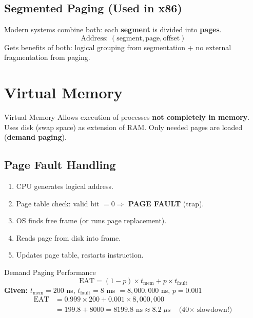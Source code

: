 \documentclass[12pt,a4paper]{article}
\begin{document}
\subsection{Segmented Paging (Used in x86)}
Modern systems combine both: each \textbf{segment} is divided into \textbf{pages}.
\[
\text{Address: } (\text{segment}, \text{page}, \text{offset})
\]
Gets benefits of both: logical grouping from segmentation + no external fragmentation from paging.

\section{Virtual Memory}

\begin{conceptbox}{Virtual Memory}
Allows execution of processes \textbf{not completely in memory}. Uses disk (swap space) as extension of RAM. Only needed pages are loaded (\textbf{demand paging}).
\end{conceptbox}

\subsection{Page Fault Handling}
\begin{enumerate}
    \item CPU generates logical address.
    \item Page table check: valid bit $= 0 \Rightarrow$ \textbf{PAGE FAULT} (trap).
    \item OS finds free frame (or runs page replacement).
    \item Reads page from disk into frame.
    \item Updates page table, restarts instruction.
\end{enumerate}

\begin{examplebox}{Demand Paging Performance}
\[
\text{EAT} = (1 - p) \times t_{\text{mem}} + p \times t_{\text{fault}}
\]
\textbf{Given:} $t_{\text{mem}} = 200$ ns, $t_{\text{fault}} = 8$ ms $= 8{,}000{,}000$ ns, $p = 0.001$
\begin{align*}
\text{EAT} &= 0.999 \times 200 + 0.001 \times 8{,}000{,}000 \\
           &= 199.8 + 8000 = \boxed{8199.8 \text{ ns}} \approx 8.2 \;\mu\text{s} \quad \text{(40$\times$ slowdown!)}
\end{align*}
\end{examplebox}
\end{document}

